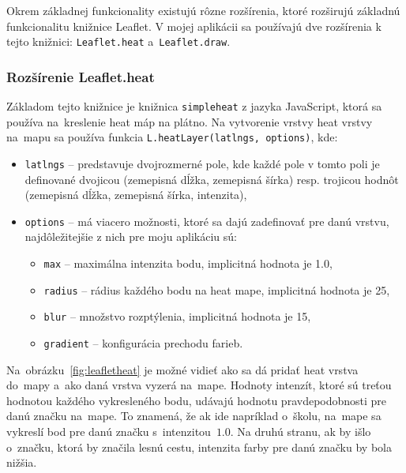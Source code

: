 Okrem základnej funkcionality existujú rôzne rozšírenia, ktoré rozširujú základnú funkcionalitu knižnice Leaflet. V mojej aplikácii sa používajú dve rozšírenia k tejto knižnici: \texttt{Leaflet.heat} a~\texttt{Leaflet.draw}.

\subsubsection{Rozšírenie Leaflet.heat}
Základom tejto knižnice je knižnica \texttt{simpleheat} z jazyka JavaScript, ktorá sa používa na~kreslenie heat máp na plátno. Na vytvorenie vrstvy heat vrstvy na~mapu sa používa funkcia \texttt{L.heatLayer(latlngs, options)}, kde:
\begin{itemize}
    \item \texttt{latlngs} \--- predstavuje dvojrozmerné pole, kde každé pole v tomto poli je definované dvojicou (zemepisná dĺžka, zemepisná šírka) resp. trojicou hodnôt (zemepisná dĺžka, zemepisná šírka, intenzita),
    \item \texttt{options} \--- má viacero možnosti, ktoré sa dajú zadefinovať pre danú vrstvu, najdôležitejšie z nich pre moju aplikáciu sú:
    \begin{itemize}
        \item \texttt{max} \--- maximálna intenzita bodu, implicitná hodnota je 1.0,
        \item \texttt{radius} \--- rádius každého bodu na heat mape, implicitná hodnota je 25,
        \item \texttt{blur} \--- množstvo rozptýlenia, implicitná hodnota je 15,
        \item \texttt{gradient} \--- konfigurácia prechodu farieb.
    \end{itemize}
\end{itemize}

Na~obrázku~\ref{fig:leafletheat} je možné vidieť ako sa dá pridať heat vrstva do~mapy a~ako daná vrstva vyzerá na~mape. Hodnoty intenzít, ktoré sú treťou hodnotou každého vykresleného bodu, udávajú hodnotu pravdepodobnosti pre danú značku na~mape. To znamená, že ak ide napríklad o~školu, na~mape sa vykreslí bod pre danú značku s~intenzitou~$1.0$. Na druhú stranu, ak by išlo o~značku, ktorá by značila lesnú cestu, intenzita farby pre danú značku by bola nižšia.


